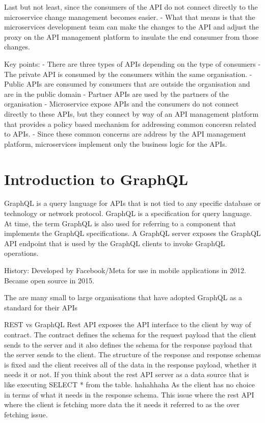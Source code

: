 Last but not least, since the consumers of the API do not connect directly to the microservice change management becomes easier.
- What that means is that the microservices development team can make the changes to the API and adjust the proxy on the API management platform to insulate the end consumer from those changes.

Key points:
- There are three types of APIs depending on the type of consumers
- The private API is consumed by the consumers within the same organisation.
- Public APIs are consumed by consumers that are outside the organisation and are in the public domain
- Partner APIs are used by the partners of the organisation
- Microservice expose APIs and the consumers do not connect directly to these APIs, but they connect by way of an API management platform that provides a policy based mechanism for addressing common concersn related to APIs.
- Since these common concerns are address by the API management platform, microservices implement only the business logic for the APIs.


\section{Introduction to GraphQL}

GraphQL is a query language for APIs that is not tied to any specific database or technology or network protocol.
GraphQL is a specification for query language.
At time, the term GraphQL is also used for referring to a component that implements the GraphQL specifications.
A GraphQL server exposes the GraphQL API endpoint that is used by the GraphQL clients to invoke GraphQL operations.

History: Developed by Facebook/Meta for use in mobile applications in 2012. Became open source in 2015.

The are many small  to large organisations that have adopted GraphQL as a standard for their APIs

REST vs GraphQL
Rest API exposes the API interface to the client by way of contract.
The contract defines the schema for the request payload that the client sends to the server and it also defines the schema for the response payload that the server sends to the client.
The structure of the response and response schemas is fixed and the client receives all of the data in  the response payload, whether it needs it or not.
If you think about the rest API server as a data source that is like executing SELECT * from the table. hahahhaha
As the client has no choice in terms of what it needs in the response schema.
This issue where the rest API where the client is fetching more data the it needs it referred to as the over fetching issue.

